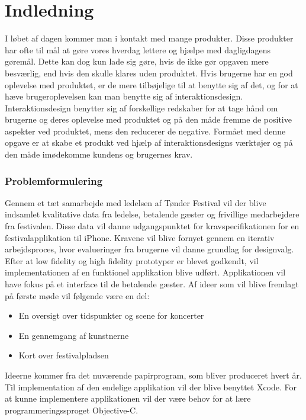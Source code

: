 \documentclass[a4paper,10pt,titlepage]{article}
\begin{document}
\section{Indledning}
I løbet af dagen kommer man i kontakt med mange produkter. Disse produkter har ofte til mål at gøre vores hverdag lettere og hjælpe med dagligdagens gøremål. Dette kan dog kun lade sig gøre, hvis de ikke gør opgaven mere besværlig, end hvis den skulle klares uden produktet. Hvis brugerne har en god oplevelse med produktet, er de mere tilbøjelige til at benytte sig af det, og for at hæve brugeroplevelsen kan man benytte sig af interaktionsdesign.\\
Interaktionsdesign benytter sig af forskellige redskaber for at tage hånd om brugerne og deres oplevelse med produktet og på den måde fremme de positive aspekter ved produktet, mens den reducerer de negative. Formået med denne opgave er at skabe et produkt ved hjælp af interaktionsdesigns værktøjer og på den måde imødekomme kundens og brugernes krav.

\subsubsection*{Problemformulering}
Gennem et tæt samarbejde med ledelsen af Tønder Festival vil der blive indsamlet kvalitative data fra ledelse, betalende gæster og frivillige medarbejdere fra festivalen. Disse data vil danne udgangspunktet for kravspecifikationen for en festivalapplikation til iPhone. Kravene vil blive fornyet gennem en iterativ arbejdsproces, hvor evalueringer fra brugerne vil danne grundlag for designvalg.  Efter at low fidelity og high fidelity prototyper er blevet godkendt, vil implementationen af en funktionel applikation blive udført. Applikationen vil have fokus på et interface til de betalende gæster. Af ideer som vil blive fremlagt på første møde vil følgende være en del:
\begin{itemize}
\item
En oversigt over tidspunkter og scene for koncerter
\item
En gennemgang af kunstnerne
\item
Kort over festivalpladsen
\end{itemize}
Ideerne kommer fra det nuværende papirprogram, som bliver produceret hvert år.  Til implementation af den endelige applikation vil der blive benyttet Xcode. For at kunne implementere applikationen vil der være behov for at lære programmeringssproget Objective-C.
\end{document}
